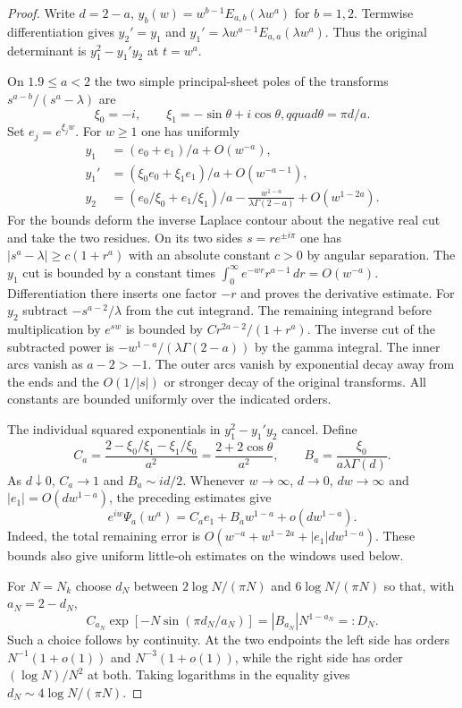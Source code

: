 \documentclass[11pt,a4paper]{article}
\numberwithin{equation}{section}
\begin{document}
\begin{proof}
Write $d=2-a$, $y_b(w)=w^{b-1}E_{a,b}(\lambda w^a)$ for $b=1,2$.
Termwise differentiation gives $y_2'=y_1$ and
$y_1'=\lambda w^{a-1}E_{a,a}(\lambda w^a)$. Thus the original
determinant is $y_1^2-y_1'y_2$ at $t=w^a$.

On $1.9\le a<2$ the two simple principal-sheet poles of the transforms
$s^{a-b}/(s^a-\lambda)$ are
\[
 \xi_0=-i,\qquad \xi_1=-\sin\theta+i\cos\theta,qquad
 \theta=\pi d/a.
\]
Set $e_j=e^{\xi_j w}$. For $w\ge1$ one has uniformly
\begin{align*}
 y_1&=(e_0+e_1)/a+O(w^{-a}),\\
 y_1'&=(\xi_0 e_0+\xi_1 e_1)/a+O(w^{-a-1}),\\
 y_2&=(e_0/\xi_0+e_1/\xi_1)/a-
          \frac{w^{1-a}}{\lambda\Gamma(2-a)}+O(w^{1-2a}).
\end{align*}
For the bounds deform the inverse Laplace contour about the negative
real cut and take the two residues. On its two sides $s=re^{\pm i\pi}$
one has $|s^a-\lambda|\ge c(1+r^a)$ with an absolute constant $c>0$
by angular separation. The $y_1$ cut is bounded by a constant times
$\int_0^\infty e^{-wr}r^{a-1}\,dr=O(w^{-a})$.
Differentiation there inserts one factor $-r$ and proves the derivative
estimate. For $y_2$ subtract $-s^{a-2}/\lambda$ from the cut
integrand. The remaining integrand before multiplication by $e^{sw}$
is bounded by $C r^{2a-2}/(1+r^a)$.
The inverse cut of the subtracted power is
$-w^{1-a}/(\lambda\Gamma(2-a))$ by the gamma integral.
The inner arcs vanish as $a-2>-1$. The outer arcs vanish by
exponential decay away from the ends and the $O(1/|s|)$ or stronger
decay of the original transforms. All constants are bounded uniformly
over the indicated orders.

The individual squared exponentials in $y_1^2-y_1'y_2$ cancel.
Define
\[
 C_a=\frac{2-\xi_0/\xi_1-\xi_1/\xi_0}{a^2}
     =\frac{2+2\cos\theta}{a^2},\qquad
 B_a=\frac{\xi_0}{a\lambda\Gamma(d)}.
\]
As $d\downarrow0$, $C_a\to1$ and $B_a\sim i d/2$.
Whenever $w\to\infty$, $d\to0$, $dw\to\infty$ and
$|e_1|=O(d w^{1-a})$, the preceding estimates give
\[
 e^{iw}\Psi_a(w^a)=C_a e_1+B_a w^{1-a}+o(d w^{1-a}).
\]
Indeed, the total remaining error is
$O(w^{-a}+w^{1-2a}+|e_1|d w^{1-a})$. These bounds also give
uniform little-oh estimates on the windows used below.

For $N=N_k$ choose $d_N$ between $2\log N/(\pi N)$ and
$6\log N/(\pi N)$ so that, with $a_N=2-d_N$,
\[
 C_{a_N}\exp[-N\sin(\pi d_N/a_N)]
     = |B_{a_N}|N^{1-a_N}=:D_N.
\]
Such a choice follows by continuity. At the two endpoints the left
side has orders $N^{-1}(1+o(1))$ and $N^{-3}(1+o(1))$, while
the right side has order $(\log N)/N^2$ at both. Taking logarithms
in the equality gives $d_N\sim4\log N/(\pi N)$.


\end{proof}
\end{document}
